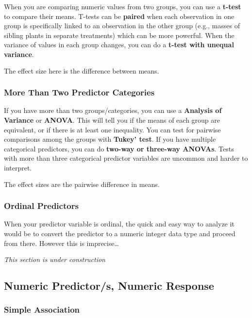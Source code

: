 \documentclass[
  letterpaper,
  DIV=11,
  numbers=noendperiod]{scrreprt}
\begin{document}
When you are comparing numeric values from two groups, you can use a
\textbf{t-test} to compare their means. T-tests can be \textbf{paired}
when each observation in one group is specifically linked to an
observation in the other group (e.g., masses of sibling plants in
separate treatments) which can be more powerful. When the variance of
values in each group changes, you can do a \textbf{t-test with unequal
variance}.

The effect size here is the difference between means.

\hypertarget{sec-anova}{%
\subsubsection{More Than Two Predictor Categories}\label{sec-anova}}

If you have more than two groups/categories, you can use a
\textbf{Analysis of Variance} or \textbf{ANOVA}. This will tell you if
the means of each group are equivalent, or if there is at least one
inequality. You can test for pairwise comparisons among the groups with
\textbf{Tukey' test}. If you have multiple categorical predictors, you
can do \textbf{two-way or three-way ANOVAs}. Tests with more than three
categorical predictor variables are uncommon and harder to interpret.

The effect sizes are the pairwise difference in means.

\hypertarget{ordinal-predictors}{%
\subsubsection{Ordinal Predictors}\label{ordinal-predictors}}

When your predictor variable is ordinal, the quick and easy way to
analyze it would be to convert the predictor to a numeric integer data
type and proceed from there. However this is imprecise\ldots{}

\emph{This section is under construction}

\hypertarget{numeric-predictors-numeric-response}{%
\subsection{Numeric Predictor/s, Numeric
Response}\label{numeric-predictors-numeric-response}}

\hypertarget{sec-corr}{%
\subsubsection{Simple Association}\label{sec-corr}}
\end{document}
